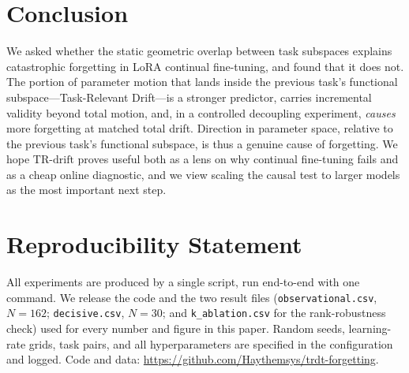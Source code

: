 \documentclass[11pt]{article}
\newcommand{\trdrift}{\mathrm{TR\text{-}drift}}
\begin{document}
\section{Conclusion}
\label{sec:conclusion}

We asked whether the static geometric overlap between task subspaces explains
catastrophic forgetting in LoRA continual fine-tuning, and found that it does
not. The portion of parameter motion that lands inside the previous task's
functional subspace---Task-Relevant Drift---is a stronger predictor, carries
incremental validity beyond total motion, and, in a controlled decoupling
experiment, \emph{causes} more forgetting at matched total drift. Direction in
parameter space, relative to the previous task's functional subspace, is thus a
genuine cause of forgetting. We hope $\trdrift$ proves useful both as a lens on
why continual fine-tuning fails and as a cheap online diagnostic, and we view
scaling the causal test to larger models as the most important next step.

\section*{Reproducibility Statement}
All experiments are produced by a single script, run end-to-end with one
command. We release the code and the two result files
(\texttt{observational.csv}, $N=162$; \texttt{decisive.csv}, $N=30$; and
\texttt{k\_ablation.csv} for the rank-robustness check) used for
every number and figure in this paper. Random seeds, learning-rate grids, task
pairs, and all hyperparameters are specified in the configuration and logged.
Code and data: \url{https://github.com/Haythemsys/trdt-forgetting}.
\end{document}
